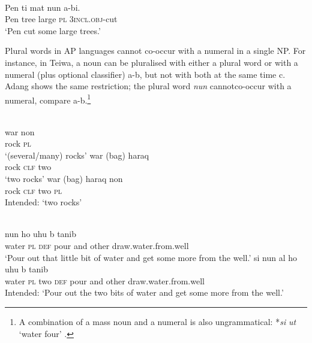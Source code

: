 \ea%
 \\
\label{ex:9:9}
\gll Pen ti {mat}{{\textepsilon}} nun {\textglotstop}a-b{{\textopeno}}{{\textglotstop}}{{\textopeno}}{i.} \\
   Pen tree large \textsc{pl} \textsc{3incl.obj}-cut \\
\glt `Pen cut some large trees.'
\z






Plural words in AP languages cannot co-occur with a numeral in a single NP. For instance, in Teiwa, a noun can be pluralised with either a plural word or with a numeral (plus optional classifier) a-b, but not with both at the same time c. Adang shows the same restriction; the plural word \textit{nun} cannotco-occur with a numeral, compare a-b.\footnote{  A combination of a mass noun and a numeral is also ungrammatical: *\textit{s}\textit{{\textepsilon}}\textit{i} \textit{ut} `water four' \citep[296]{Haan2001}.}


\ea%
\label{ex:9:10}
 \\
\ea
\gll  war non\\
   rock \textsc{pl}  \\
\glt `(several/many) rocks'
\ex
\gll war (bag) {haraq}\\
 rock \textsc{clf} two  \\
\glt   `two rocks'
\ex
\gll *war (bag) haraq non \\
 rock \textsc{clf} two \textsc{pl} \\
 \glt Intended: `two rocks'
\z
\z



\ea%
\label{ex:9:11}
 \\
\ea
{} nun ho {\textglotstop}uhu{\textltailn} {\textepsilon}  b{\textepsilon}{\ng} tanib \\
   water \textsc{pl} \textsc{def} pour and other draw.water.from.well  \\
\glt `Pour out that little bit of water and get some more from the well.'
\ex
\gll *s{\textepsilon}{i} nun al{\textopeno} ho {\textglotstop}uhu{\textltailn} {\textepsilon} b{\textepsilon}{\ng} tanib \\
   water \textsc{pl} two \textsc{def} pour and other draw.water.from.well  \\
\glt  Intended: `Pour out the two bits of water and get some more from the well.'
\z
\z

